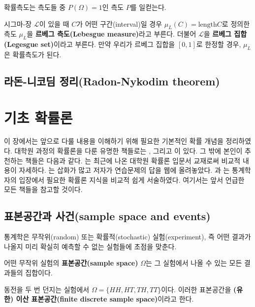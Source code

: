 \documentclass[b5paper,]{scrbook}
\theoremstyle{plain}
\theoremstyle{definition}
\numberwithin{equation}{section}
\let\BeginKnitrBlock\begin \let\EndKnitrBlock\end
\begin{document}
확률측도는 측도들 중 \(P(\Omega)=1\)인 측도 \(P\)를 일컫는다.

\BeginKnitrBlock{definition}[르베그 측도]
\protect\hypertarget{def:unnamed-chunk-37}{}{\label{def:unnamed-chunk-37}
{} }시그마-장 \(\mathcal{L}\)이 있을 때
\(C\)가 어떤 구간(interval)일 경우 \(\mu_{L}(C)=\text{length}C\)로
정의한 측도 \(\mu_{L}\)을 \textbf{르베그 측도(Lebesgue measure)}라고
부른다. 더불어 \(\mathcal{L}\)을 \textbf{르베그 집합(Legesgue
set)}이라고 부른다. 만약 우리가 르베그 집합을 \([0,1]\)로 한정할 경우,
\(\mu_{L}\)은 확률측도가 된다.
\EndKnitrBlock{definition}

\section{라돈-니코딤 정리(Radon-Nykodim
theorem)}\label{--radon-nykodim-theorem}

\chapter{기초 확률론}\label{basicprob}

이 장에서는 앞으로 다룰 내용을 이해하기 위해 필요한 기본적인 확률 개념을
정리하였다. 대학원 과정의 확률론을 다룬 유명한 책들로는
\citep{Durrett2010}, \citep{Billingsley2012} 그리고 \citep{Chung2001}이
있다. 그 밖에 본인이 추천하는 책들은 다음과 같다. \citep{Gut2012}는
최근에 나온 대학원 확률론 입문서 교재로써 비교적 내용이 자세하다.
\citep{Schilling2005}는 삽화가 많고 저자가 연습문제의 답을 웹에
올려놓았다. \citep{Shorack2006}과 \citep{Proschan2016}는 통계학자의
입장에서 필요한 확률론 지식을 비교적 쉽게 서술하였다. 여기서는 앞서
언급한 모든 책들을 참고할 것이다.

\section{표본공간과 사건(sample space and
events)}\label{-sample-space-and-events}

통계학은 무작위(random) 또는 확률적(stochastic) 실험(experiment), 즉
어떤 결과가 나올지 미리 확실히 예측할 수 없는 실험들에 초점을 맞춘다.

\BeginKnitrBlock{definition}[표본공간]
\protect\hypertarget{def:unnamed-chunk-38}{}{\label{def:unnamed-chunk-38}
{} }어떤 무작위 실험의 \textbf{표본공간(sample
space)} \(\Omega\)는 그 실험에서 나올 수 있는 모든 결과들의 집합이다.
\EndKnitrBlock{definition}

\BeginKnitrBlock{example}[동전 던지기 실험]
\protect\hypertarget{exm:unnamed-chunk-39}{}{\label{exm:unnamed-chunk-39}
{} }동전을 두 번 던지는 실험에서
\(\Omega=\{ HH, HT, TH, TT \}\)이다. 이러한 표본공간을 \textbf{(유한)
이산 표본공간(finite discrete sample space)}이라고 한다.
\EndKnitrBlock{example}
\end{document}
